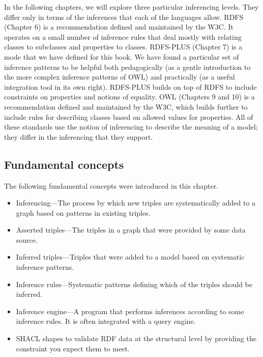 In the following chapters, we will explore three particular inferencing
levels. They differ only in terms of the inferences that each of the
languages allow. RDFS (Chapter 6) is a recommendation defined and
maintained by the W3C. It operates on a small number of inference rules
that deal mostly with relating classes to subclasses and properties to
classes. RDFS-PLUS (Chapter 7) is a mode that we have defined for this
book. We have found a particular set of inference patterns to be helpful
both pedagogically (as a gentle introduction to the more complex
inference patterns of OWL) and practically (as a useful integration tool
in its own right). RDFS-PLUS builds on top of RDFS to include
constraints on properties and notions of equality. OWL (Chapters 9 and
10) is a recommendation defined and maintained by the W3C, which builds
further to include rules for describing classes based on allowed values
for properties. All of these standards use the notion of inferencing to
describe the meaning of a model; they differ in the inferencing that
they support.

\subsection{Fundamental concepts}

The following fundamental concepts were introduced in this chapter.

\begin{itemize}
\item Inferencing---The process by which new triples are systematically added
to a graph based on patterns in existing triples.

\item Asserted triples---The triples in a graph that were provided by some
data source.

\item Inferred triples---Triples that were added to a model based on
systematic inference patterns.

\item Inference rules---Systematic patterns defining which of the triples
should be inferred.

\item Inference engine---A program that performs inferences according to some
inference rules. It is often integrated with a query engine.

\item
  SHACL shapes to validate RDF data at the structural level by providing
  the constraint you expect them to meet.
  \end{itemize}
  
